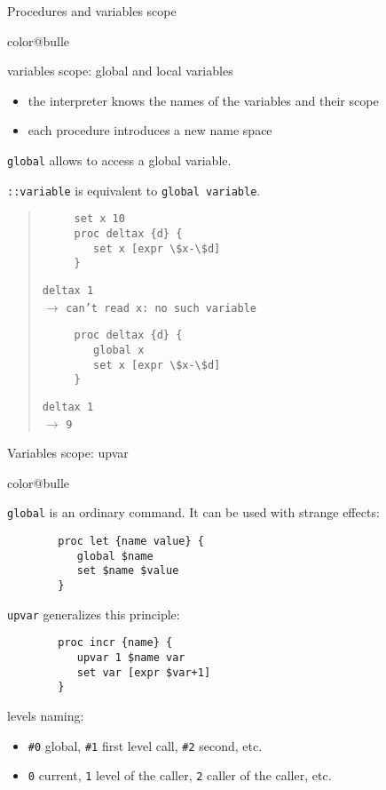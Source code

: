 \documentclass[a4paper,landscape,smooth]{show}
\newcommand{\tclex}[2]{\texttt{#1}\\$\rightarrow$ \texttt{#2}}
\begin{document}

\begin{tslide}{Procedures and variables scope}
   \vfill
   \begin{bitemize}{color@bulle}
      \item variables scope:  global and local variables
      \begin{itemize}
	 \item the interpreter knows the names of the variables and their
scope
	 \item each procedure introduces a new name space
      \end{itemize}
   \item \texttt{global} allows to access a global variable. 
   \item \texttt{::variable} is equivalent to \texttt{global variable}. 
   \end{bitemize}
   \begin{quote}
      \begin{verbatim}
	 set x 10
	 proc deltax {d} {
	    set x [expr \$x-\$d]
	 }
      \end{verbatim}
      \tclex{deltax 1}{can't read x: no such variable}\\
      \begin{verbatim}
	 proc deltax {d} {
	    global x
	    set x [expr \$x-\$d]
	 }
      \end{verbatim}
      \tclex{deltax 1}{9}
   \end{quote}
   \vfill
\end{tslide}


\begin{tslide}{Variables scope: upvar}
   \vfill
   \begin{bitemize}{color@bulle}
      \item \texttt{global} is an ordinary command. It can be used with
strange effects:
	 \begin{verbatim}
	    proc let {name value} {
	       global $name
	       set $name $value
	    }
	 \end{verbatim} %

      \item \texttt{upvar} generalizes this principle:
	 \begin{verbatim}
	    proc incr {name} {
	       upvar 1 $name var
	       set var [expr $var+1]
	    }
	 \end{verbatim}

      \item levels naming:
	 \begin{itemize}
	    \item \verb|#0| global, \verb|#1| first level call, \verb|#2|
	       second, etc.
	    \item \verb|0| current, \verb|1| level of the caller, \verb|2|
	       caller of the caller, etc.
	 \end{itemize}
   \end{bitemize}
   \vfill
\end{tslide}
\end{document}
